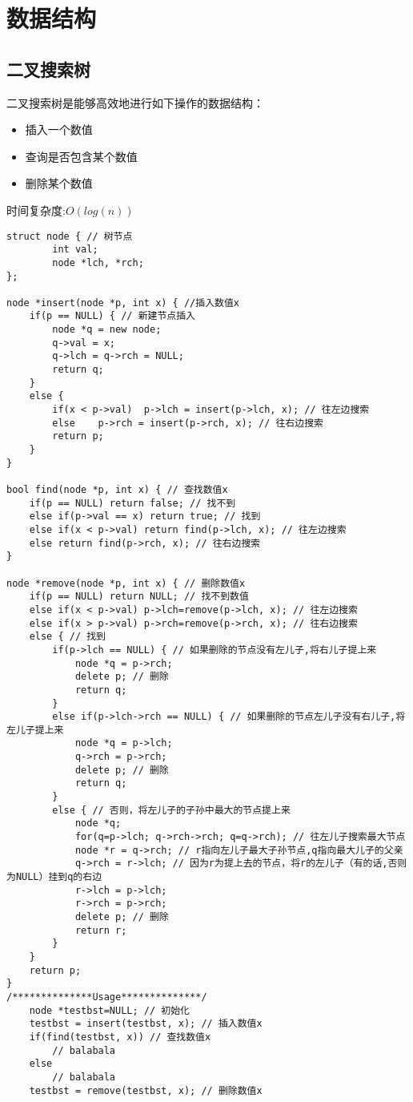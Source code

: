 \documentclass[a4paper]{ctexrep}
\begin{document}
\chapter{数据结构}
\section{二叉搜索树}
二叉搜索树是能够高效地进行如下操作的数据结构：
\begin{itemize}
		\item 插入一个数值
		\item 查询是否包含某个数值
		\item 删除某个数值
\end{itemize}

时间复杂度:\(O(log(n))\)
\begin{lstlisting}
struct node { // 树节点
		int val;
		node *lch, *rch;
};

node *insert(node *p, int x) { //插入数值x
	if(p == NULL) { // 新建节点插入
		node *q = new node;
		q->val = x;
		q->lch = q->rch = NULL;
		return q;
	}
	else {
		if(x < p->val)	p->lch = insert(p->lch, x); // 往左边搜索
		else	p->rch = insert(p->rch, x); // 往右边搜索
		return p;
	}
}

bool find(node *p, int x) { // 查找数值x
	if(p == NULL) return false; // 找不到
	else if(p->val == x) return true; // 找到
	else if(x < p->val) return find(p->lch, x); // 往左边搜索
	else return find(p->rch, x); // 往右边搜索
}

node *remove(node *p, int x) { // 删除数值x
	if(p == NULL) return NULL; // 找不到数值
	else if(x < p->val) p->lch=remove(p->lch, x); // 往左边搜索
	else if(x > p->val) p->rch=remove(p->rch, x); // 往右边搜索
	else { // 找到
		if(p->lch == NULL) { // 如果删除的节点没有左儿子,将右儿子提上来
			node *q = p->rch;
			delete p; // 删除
			return q;
		}
		else if(p->lch->rch == NULL) { // 如果删除的节点左儿子没有右儿子,将左儿子提上来
			node *q = p->lch;
			q->rch = p->rch;
			delete p; // 删除
			return q;
		}
		else { // 否则，将左儿子的子孙中最大的节点提上来
			node *q;
			for(q=p->lch; q->rch->rch; q=q->rch); // 往左儿子搜索最大节点
			node *r = q->rch; // r指向左儿子最大子孙节点,q指向最大儿子的父亲
			q->rch = r->lch; // 因为r为提上去的节点，将r的左儿子（有的话,否则为NULL）挂到q的右边
			r->lch = p->lch;
			r->rch = p->rch;
			delete p; // 删除
			return r;
		}
	}
	return p;
}
/**************Usage**************/
	node *testbst=NULL; // 初始化
	testbst = insert(testbst, x); // 插入数值x
	if(find(testbst, x)) // 查找数值x
		// balabala
	else
		// balabala
	testbst = remove(testbst, x); // 删除数值x
\end{lstlisting}
\end{document}

